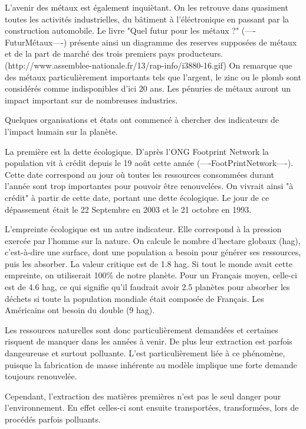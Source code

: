 L'avenir des métaux est également inquiètant. On les retrouve dans quasiment toutes les activités industrielles, du bâtiment à l'éléctronique en passant par la construction automobile. Le livre "Quel futur pour les métaux ?" (----FuturMétaux----) présente ainsi un diagramme des reserves supposées de métaux et de la part de marché des trois premiers pays producteurs.
(http://www.assemblee-nationale.fr/13/rap-info/i3880-16.gif)
On remarque que des métaux particulièrement importants tels que l'argent, le zinc ou le plomb sont considérés comme indisponibles d'ici 20 ans. Les pénuries de métaux auront un impact important sur de nombreuses industries. 


\smallbreak Quelques organisations et états ont commencé à chercher des indicateurs de l'impact humain sur la planète.

La première est la dette écologique. D'après l'ONG Footprint Network la population vit à crédit depuis le 19 août cette année (----FootPrintNetwork----). Cette date correspond au jour où toutes les ressources consommées durant l'année sont trop importantes pour pouvoir être renouvelées. On vivrait ainsi "à crédit" à partir de cette date, portant une dette écologique. Le jour de ce dépassement était le 22 Septembre en 2003 et le 21 octobre en 1993.

L'empreinte écologique est un autre indicateur. Elle correspond à la pression exercée par l'homme sur la nature. On calcule le nombre d'hectare globaux (hag), c'est-à-dire une surface, dont une population a besoin pour générer ses ressources, puis les absorber. La valeur critique est de 1.8 hag. Si tout le monde avait cette empreinte, on utiliserait 100\% de notre planète. Pour un Français moyen, celle-ci est de 4.6 hag, ce qui signifie qu'il faudrait avoir 2.5 planètes pour absorber les déchets si toute la population mondiale était composée de Français. Les Américains ont besoin du double (9 hag).

\smallbreak Les ressources naturelles sont donc particulièrement demandées et certaines risquent de manquer dans les années à venir. De plus leur extraction est parfois dangeureuse et surtout polluante. L'\op est particulièrement liée à ce phénomène, puisque la fabrication de masse inhérente au modèle implique une forte demande toujours renouvelée. 

Cependant, l'extraction des matières premières n'est pas le seul danger pour l'environnement. En effet celles-ci sont ensuite transportées, transformées, lors de procédés parfois polluants.







